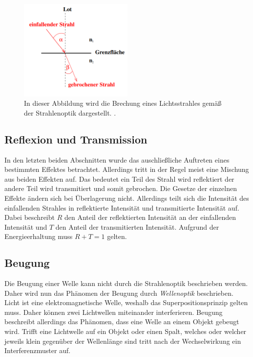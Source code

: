 \begin{figure}
  \centering
  \includegraphics[width=0.5\textwidth]{content/Brechung.png}
  \caption{In dieser Abbildung wird die Brechung eines Lichtsstrahles gemäß der Strahlenoptik dargestellt. \cite{v400}.}
  \label{fig:Brechung}
\end{figure}

\subsection{Reflexion und Transmission}
\label{subsec:ReUTra}
In den letzten beiden Abschnitten wurde das auschließliche Auftreten eines bestimmten Effektes betrachtet. Allerdings tritt in der Regel meist eine Mischung aus beiden Effekten
auf. Das bedeutet ein Teil des Strahl wird reflektiert der andere Teil wird transmitiert und somit gebrochen. Die Gesetze der einzelnen Effekte ändern sich bei Überlagerung
nicht. Allerdings teilt sich die Intensität des einfallenden Strahles in reflektierte Intensität und transmitierte Intensität auf. Dabei beschreibt $R$ den Anteil der 
reflektierten Intensität an der einfallenden Intensität und $T$ den Anteil der transmitierten Intensität. Aufgrund der Energieerhaltung muss $R + T = 1$ gelten.

\subsection{Beugung}
\label{subsec:Beugung}
Die Beugung einer Welle kann nicht durch die Strahlenoptik beschrieben werden. Daher wird nun das Phänomen der Beugung durch \textit{Wellenoptik} beschrieben. Licht ist eine
elektromagnetische Welle, weshalb das Superpositionsprinzip gelten muss. Daher können zwei Lichtwellen miteinander interferieren. Beugung beschreibt allerdings das Phänomen,
dass eine Welle an einem Objekt gebeugt wird. Trifft eine Lichtwelle auf ein Objekt oder einen Spalt, welches oder welcher jeweils klein gegenüber der Wellenlänge sind tritt
nach der Wechselwirkung ein Interferenzmuster auf.   